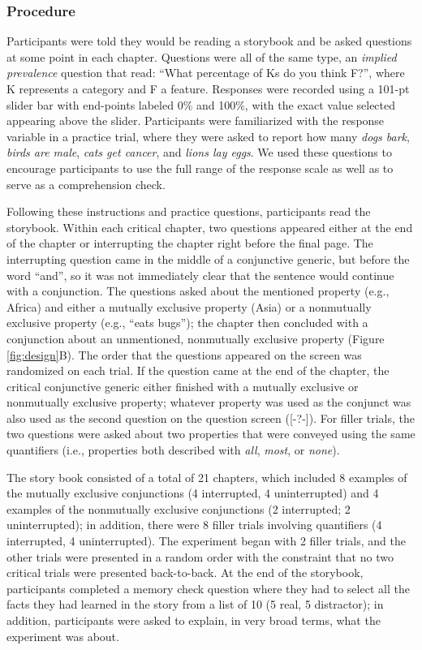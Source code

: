 \documentclass[10pt,letterpaper]{article}
\newcommand{\red}[1]{{\textcolor{Red}{#1}}}
\begin{document}
\subsubsection{Procedure}
Participants were told they would be reading a storybook and be asked questions at some point in each chapter. 
Questions were all of the same type, an \emph{implied prevalence} question \cite{Gelman2002, Cimpian2010} that read: ``What percentage of Ks do you think F?'', where K represents a category and F a feature. 
Responses were recorded using a 101-pt slider bar with end-points labeled 0\% and 100\%, with the exact value selected appearing above the slider. 
Participants were familiarized with the response variable in a practice trial, where they were asked to report how many \emph{dogs bark}, \emph{birds are male}, \emph{cats get cancer}, and \emph{lions lay eggs}. 
We used these questions to encourage participants to use the full range of the response scale as well as to serve as a comprehension check. 

Following these instructions and practice questions, participants read the storybook.
Within each critical chapter, two questions appeared either at the end of the chapter or interrupting the chapter right before the final page.
The interrupting question came in the middle of a conjunctive generic, but before the word ``and'', so it was not immediately clear that the sentence would continue with a conjunction.
The questions asked about the mentioned property (e.g., Africa) and either a mutually exclusive property (Asia) or a nonmutually exclusive property (e.g., ``eats bugs''); the chapter then concluded with a conjunction about an unmentioned, nonmutually exclusive property (Figure \ref{fig:design}B).
The order that the questions appeared on the screen was randomized on each trial.
If the question came at the end of the chapter, the critical conjunctive generic either finished with a mutually exclusive or nonmutually exclusive property; whatever property was used as the conjunct was also used as the second question on the question screen ([-?-]).
For filler trials, the two questions were asked about two properties that were conveyed using the same quantifiers (i.e., properties both described with \emph{all}, \emph{most}, or \emph{none}).

The story book consisted of a total of 21 chapters, which included 8 examples of the mutually exclusive conjunctions (4 interrupted, 4 uninterrupted) and 4 examples of the nonmutually exclusive conjunctions (2 interrupted; 2 uninterrupted); in addition, there were 8 filler trials involving quantifiers (4 interrupted, 4 uninterrupted). 
The experiment began with 2 filler trials, and the other trials were presented in a random order with the constraint that no two critical trials were presented back-to-back. 
At the end of the storybook, participants completed a memory check question where they had to select all the facts they had learned in the story from a list of 10 (5 real, 5 distractor); in addition, participants were asked to explain, in very broad terms, what the experiment was about.
\end{document}
